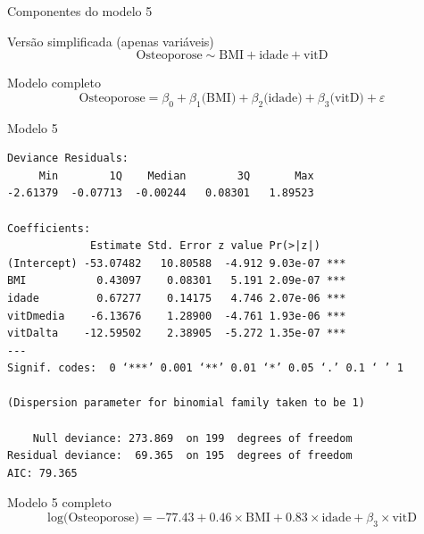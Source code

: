 \documentclass{beamer}
\begin{document}
\begin{frame}{\scriptsize Componentes do modelo 5}
  \begin{block}{\footnotesize Versão simplificada (apenas variáveis)}
    \footnotesize
    \begin{displaymath}
      \text{Osteoporose} \sim \text{BMI} + \text{idade} + \text{vitD}
    \end{displaymath}
  \end{block}
  \bigskip
  \bigskip
  \begin{block}{Modelo completo}
    \footnotesize
    \begin{displaymath}
      \text{Osteoporose} =\beta_0 + \beta_1 \text{(BMI)} + \beta_2 \text{(idade)} + \beta_3 \text{(vitD)} +\varepsilon
    \end{displaymath}
  \end{block}
  \vfill
\end{frame}

\begin{frame}[fragile]{\scriptsize }
  \begin{center}
    \begin{exampleblock}{Modelo 5}
      \tiny
\begin{verbatim}
Deviance Residuals: 
     Min        1Q    Median        3Q       Max  
-2.61379  -0.07713  -0.00244   0.08301   1.89523  

Coefficients:
             Estimate Std. Error z value Pr(>|z|)    
(Intercept) -53.07482   10.80588  -4.912 9.03e-07 ***
BMI           0.43097    0.08301   5.191 2.09e-07 ***
idade         0.67277    0.14175   4.746 2.07e-06 ***
vitDmedia    -6.13676    1.28900  -4.761 1.93e-06 ***
vitDalta    -12.59502    2.38905  -5.272 1.35e-07 ***
---
Signif. codes:  0 ‘***’ 0.001 ‘**’ 0.01 ‘*’ 0.05 ‘.’ 0.1 ‘ ’ 1

(Dispersion parameter for binomial family taken to be 1)

    Null deviance: 273.869  on 199  degrees of freedom
Residual deviance:  69.365  on 195  degrees of freedom
AIC: 79.365
\end{verbatim}
    \end{exampleblock}
  \begin{exampleblock}{Modelo 5 completo}
    \scriptsize
    \begin{displaymath}
      \text{log(Osteoporose)} =-77.43 + 0.46 \times\text{BMI} + 0.83 \times\text{idade} + \beta_3 \times\text{vitD}
    \end{displaymath}
  \end{exampleblock}
  \end{center}
\end{frame}
\end{document}
